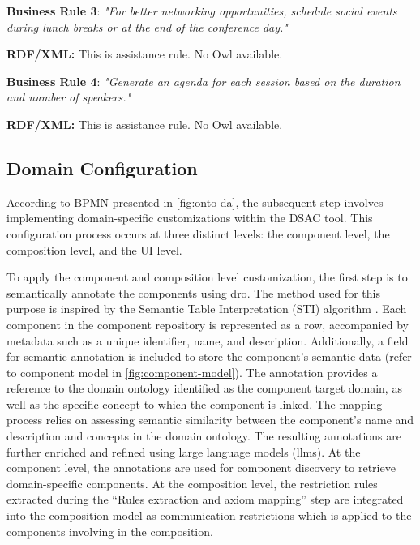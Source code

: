 \textbf{Business Rule 3}: \emph{"For better networking opportunities, schedule
social events during lunch breaks or at the end of the conference day."}

\textbf{RDF/XML:} This is assistance rule. No Owl available.

\textbf{Business Rule 4}: \emph{"Generate an agenda for each session based on
the duration and number of speakers."}

\textbf{RDF/XML:} This is assistance rule. No Owl available.

\vspace{-15pt}
\hypertarget{sec:onto.dc}{%
\subsection{Domain Configuration}\label{sec:onto.dc}}
\vspace{10pt}

According to BPMN presented in \cref{fig:onto-da}, the subsequent step involves
implementing domain-specific customizations within the DSAC tool. This
configuration process occurs at three distinct levels: the component
level, the composition level, and the UI level.

To apply the component and composition level customization, the first
step is to semantically annotate the components using \gls{dro}. The method
used for this purpose is inspired by the Semantic Table Interpretation
(STI) algorithm \autocite{Huynh2023}. Each component in the
component repository is represented as a row, accompanied by metadata
such as a unique identifier, name, and description. Additionally, a
field for semantic annotation is included to store the component's
semantic data (refer to component model in \cref{fig:component-model}). The annotation
provides a reference to the domain ontology identified as the component
target domain, as well as the specific concept to which the component is
linked. The mapping process relies on assessing semantic similarity
between the component's name and description and concepts in the domain
ontology. The resulting annotations are further enriched and refined
using large language models (\gls{llm}s). At the component level, the
annotations are used for component discovery to retrieve domain-specific
components. At the composition level, the restriction rules extracted
during the ``Rules extraction and axiom mapping'' step are integrated
into the composition model as communication restrictions which is
applied to the components involving in the composition.

